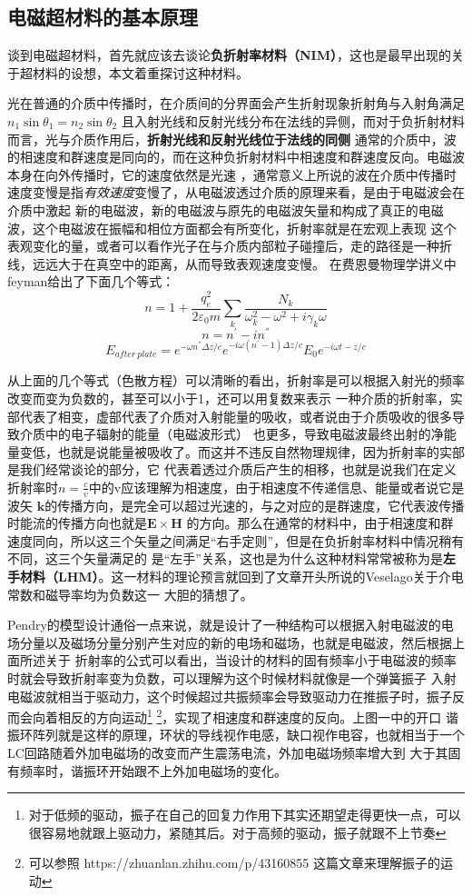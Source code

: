 \documentclass[UTF8]{ctexart}
\begin{document}
\subsection{电磁超材料的基本原理}
谈到电磁超材料，首先就应该去谈论\textbf{负折射率材料（NIM）}，这也是最早出现的关于超材料的设想，本文着重探讨这种材料。


光在普通的介质中传播时，在介质间的分界面会产生折射现象折射角与入射角满足$n_{1}\sin \theta_{1} = n_{2}\sin \theta_{2}$
且入射光线和反射光线分布在法线的异侧，而对于负折射材料而言，光与介质作用后，\textbf{折射光线和反射光线位于法线的同侧}
通常的介质中，波的相速度和群速度是同向的，而在这种负折射材料中相速度和群速度反向。电磁波本身在向外传播时，它的速度依然是光速
，通常意义上所说的波在介质中传播时速度变慢是指\textit{有效速度}变慢了，从电磁波透过介质的原理来看，是由于电磁波会在介质中激起
新的电磁波，新的电磁波与原先的电磁波矢量和构成了真正的电磁波，这个电磁波在振幅和相位方面都会有所变化，折射率就是在宏观上表现
这个表观变化的量，或者可以看作光子在与介质内部粒子碰撞后，走的路径是一种折线，远远大于在真空中的距离，从而导致表观速度变慢。
在费恩曼物理学讲义中feyman给出了下面几个等式\cite{feyman}：
$$
n=1+\frac{q_{e}^{2}}{2\varepsilon_{0}m}\sum_{k}^{} \frac{N_{k}}{\omega _{k}^{2}-\omega ^{2}+i\gamma _{k}\omega } 
$$
$$
n=n^{'}-in^{''}
$$
$$
E_{after\ plate}=e^{-\omega n^{''}\Delta z/c}e^{-i\omega(n^{'}-1)\Delta z/c}E_{0}e^{-i\omega t- z/c}
$$


从上面的几个等式（色散方程）可以清晰的看出，折射率是可以根据入射光的频率改变而变为负数的，甚至可以小于1，还可以用复数来表示
一种介质的折射率，实部代表了相变，虚部代表了介质对入射能量的吸收，或者说由于介质吸收的很多导致介质中的电子辐射的能量（电磁波形式）
也更多，导致电磁波最终出射的净能量变低，也就是说能量被吸收了。而这并不违反自然物理规律，因为折射率的实部是我们经常谈论的部分，它
代表着透过介质后产生的相移，也就是说我们在定义折射率时$n=\frac{c}{v}$中的v应该理解为相速度，由于相速度不传递信息、能量或者说它是波矢
$\bm{k}$的传播方向，是完全可以超过光速的，与之对应的是群速度，它代表波传播时能流的传播方向也就是$\bm{E} \times \bm{H}$
的方向。那么在通常的材料中，由于相速度和群速度同向，所以这三个矢量之间满足“右手定则”，但是在负折射率材料中情况稍有不同，这三个矢量满足的
是“左手”关系，这也是为什么这种材料常常被称为是\textbf{左手材料（LHM）}。这一材料的理论预言就回到了文章开头所说的Veselago关于介电常数和磁导率均为负数这一
大胆的猜想了。


Pendry的模型设计通俗一点来说，就是设计了一种结构可以根据入射电磁波的电场分量以及磁场分量分别产生对应的新的电场和磁场，也就是电磁波，然后根据上面所述关于
折射率的公式可以看出，当设计的材料的固有频率小于电磁波的频率时就会导致折射率变为负数，可以理解为这个时候材料就像是一个弹簧振子
入射电磁波就相当于驱动力，这个时候超过共振频率会导致驱动力在推振子时，振子反而会向着相反的方向运动\footnote{对于低频的驱动，振子在自己的回复力作用下其实还期望走得更快一点，可以很容易地就跟上驱动力，紧随其后。对于高频的驱动，振子就跟不上节奏}
\footnote{可以参照 https://zhuanlan.zhihu.com/p/43160855 这篇文章来理解振子的运动}，实现了相速度和群速度的反向。上图一中的开口
谐振环阵列就是这样的原理，环状的导线视作电感，缺口视作电容，也就相当于一个LC回路随着外加电磁场的改变而产生震荡电流，外加电磁场频率增大到
大于其固有频率时，谐振环开始跟不上外加电磁场的变化。
\end{document}
